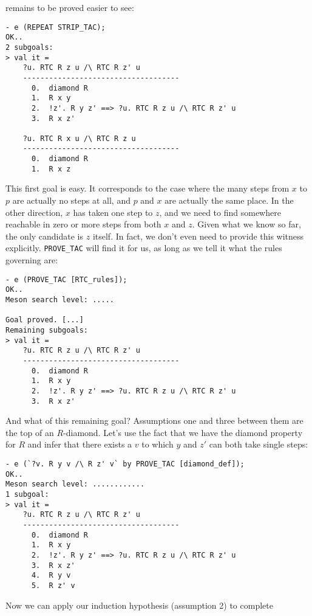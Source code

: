 remains to be proved easier to see:
\begin{session}\begin{verbatim}
- e (REPEAT STRIP_TAC);
OK..
2 subgoals:
> val it =
    ?u. RTC R z u /\ RTC R z' u
    ------------------------------------
      0.  diamond R
      1.  R x y
      2.  !z'. R y z' ==> ?u. RTC R z u /\ RTC R z' u
      3.  R x z'

    ?u. RTC R x u /\ RTC R z u
    ------------------------------------
      0.  diamond R
      1.  R x z
\end{verbatim}\end{session}
This first goal is easy.  It corresponds to the case where the many
steps from $x$ to $p$ are actually no steps at all, and $p$ and $x$
are actually the same place.  In the other direction, $x$ has taken
one step to $z$, and we need to find somewhere reachable in zero or
more steps from both $x$ and $z$.  Given what we know so far, the only
candidate is $z$ itself.  In fact, we don't even need to provide this
witness explicitly. \texttt{PROVE\_TAC} will find it for us, as long
as we tell it what the rules governing  are:
\begin{session}\begin{verbatim}
- e (PROVE_TAC [RTC_rules]);
OK..
Meson search level: .....

Goal proved. [...]
Remaining subgoals:
> val it =
    ?u. RTC R z u /\ RTC R z' u
    ------------------------------------
      0.  diamond R
      1.  R x y
      2.  !z'. R y z' ==> ?u. RTC R z u /\ RTC R z' u
      3.  R x z'
\end{verbatim}\end{session}
    And what of this remaining goal?  Assumptions one and three
    between them are the top of an $R$-diamond.  Let's use the fact
    that we have the diamond property for $R$ and infer that there
    exists a $v$ to which $y$ and $z'$ can both take single steps:
\begin{session}\begin{verbatim}
- e (`?v. R y v /\ R z' v` by PROVE_TAC [diamond_def]);
OK..
Meson search level: ............
1 subgoal:
> val it =
    ?u. RTC R z u /\ RTC R z' u
    ------------------------------------
      0.  diamond R
      1.  R x y
      2.  !z'. R y z' ==> ?u. RTC R z u /\ RTC R z' u
      3.  R x z'
      4.  R y v
      5.  R z' v
\end{verbatim}\end{session}
Now we can apply our induction hypothesis (assumption 2) to complete
